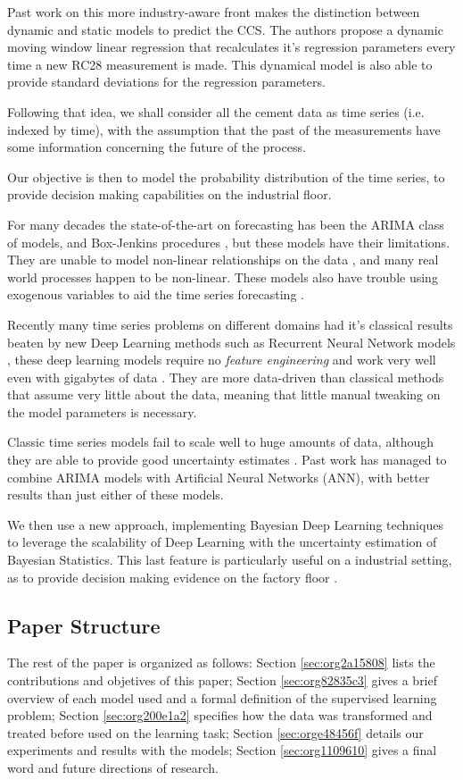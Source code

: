\documentclass[11pt]{article}
\begin{document}
Past work on this more industry-aware front \cite{greciaLin} makes the distinction between dynamic and static models to predict the CCS. 
The authors propose a dynamic moving window linear regression that recalculates it's regression parameters every time a new RC28 measurement is made. 
This dynamical model is also able to provide standard deviations for the regression parameters.

Following that idea, we shall consider all the cement data as time series (i.e. indexed by time), 
with the assumption that the past of the measurements have some information concerning the future of the process.

Our objective is then to model the probability distribution of the time series, to provide decision making capabilities on the industrial floor.

For many decades the state-of-the-art on forecasting has been the ARIMA class of models, and Box-Jenkins procedures \cite{inbook}, but these models have their limitations. 
They are unable to model non-linear relationships on the data \cite{forecasting}, and many real world processes happen to be non-linear. These models also have trouble using exogenous variables 
to aid the time series forecasting \cite{ubertime}.

Recently many time series problems on different domains had it's classical results beaten by new Deep Learning methods such as Recurrent Neural Network models \cite{energylstm,lstmbr},
these deep learning models require no \emph{feature engineering} and work very well even with gigabytes of data \cite{ARIMA_LSTM}. They are more data-driven than classical methods
that assume very little about the data, meaning that little manual tweaking on the model parameters is necessary.

Classic time series models fail to scale well to huge amounts of data, although they are able to provide good uncertainty estimates \cite{deepar}. Past work \cite{DIAZROBLES20088331,KHASHEI2010479} 
has managed to combine ARIMA models with Artificial Neural Networks (ANN), with better results than just either of these models.

We then use a new approach, implementing Bayesian Deep Learning techniques to leverage the scalability of Deep Learning with the uncertainty estimation of Bayesian Statistics. 
This last feature is particularly useful on a industrial setting, as to provide decision making evidence on the factory floor \cite{deepfactors}. 

\subsection{Paper Structure}
\label{sec:orgc99c9df}
The rest of the paper is organized as follows: Section \ref{sec:org2a15808} lists the contributions and objetives of this paper; Section \ref{sec:org82835c3} gives a brief
overview of each model used and a formal definition of the supervised learning problem; Section \ref{sec:org200e1a2} specifies how the data was transformed and treated before 
used on the learning task; Section \ref{sec:orge48456f} details our experiments and results with the models; Section \ref{sec:org1109610} gives a final word and future directions of research. 
\end{document}
